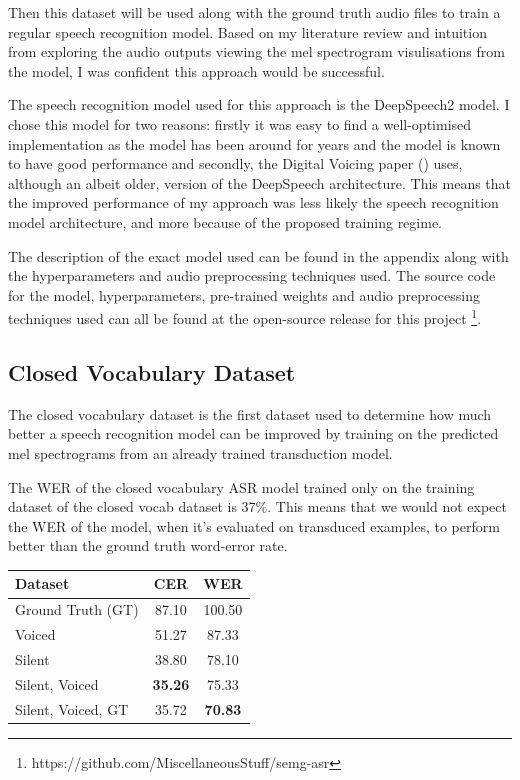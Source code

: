 Then this dataset will be used along with the ground truth audio
files to train a regular speech recognition model. Based on my literature review
and intuition from exploring the audio outputs viewing the mel spectrogram
visulisations from the model, I was confident this approach would be successful.

The speech recognition model used for this approach is the DeepSpeech2 model.
I chose this model for two reasons: firstly it was easy to find a well-optimised
implementation as the model has been around for years and the model is known
to have good performance and secondly, the Digital Voicing paper
(\cite{gaddy2020digital}) uses, although an albeit older, version of the
DeepSpeech architecture. This means that the improved performance of my approach was
less likely the speech recognition model architecture, and more because of the proposed
training regime.

The description of the exact model used can be found in the appendix along with the
hyperparameters and audio preprocessing techniques used. The source code for the
model, hyperparameters, pre-trained weights and audio preprocessing techniques
used can all be found at the open-source release for this project
\footnote{https://github.com/MiscellaneousStuff/semg-asr}.

\subsection{Closed Vocabulary Dataset}

The closed vocabulary dataset is the first dataset used to determine how much better
a speech recognition model can be improved by training on the predicted mel spectrograms
from an already trained transduction model.

The WER of the closed vocabulary ASR model trained only on the training dataset
of the closed vocab dataset is 37\%. This means that we would not expect the WER
of the model, when it's evaluated on transduced examples, to perform better than
the ground truth word-error rate.

{\small\begin{center}
\begin{tabular} {  l  c  c  }
\hline
\textbf{Dataset} & \textbf{CER} & \textbf{WER} \\
\hline
Ground Truth (GT) & 87.10 & 100.50 \\
Voiced & 51.27 & 87.33 \\
Silent & 38.80 & 78.10 \\
Silent, Voiced & \textbf{35.26} & 75.33 \\
\hline
Silent, Voiced, GT & 35.72 & \textbf{70.83} \\
\hline
\end{tabular}
\end{center}}

